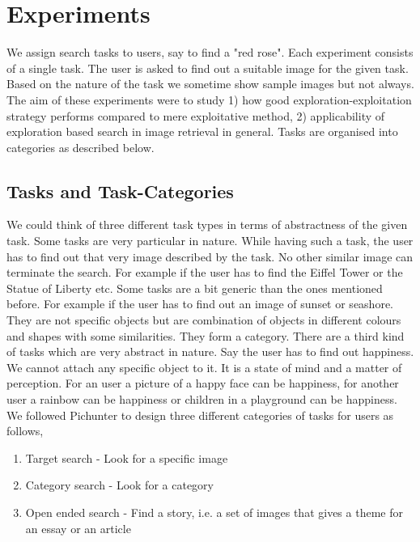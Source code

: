 \documentclass[english]{tktltiki}
\begin{document}
\section{Experiments}

We assign search tasks to users, say to find a "red rose". Each experiment consists of a single task. The user is asked to find out a suitable image for the given task. Based on the nature of the task we sometime show sample images but not always. The aim of these experiments were to study 1) how good exploration-exploitation strategy performs compared to mere exploitative method, 2) applicability of exploration based search in image retrieval in general. Tasks are organised into categories as described below.

\subsection{Tasks and Task-Categories}

 We could think of three different task types in terms of abstractness of the given task. Some tasks are very particular in nature. While having such a task, the user has to find out that very image described by the task. No other similar image can terminate the search. For example if the user has to find the Eiffel Tower or the Statue of Liberty etc. Some tasks are a bit generic than the ones mentioned before. For example if the user has to find out an image of sunset or seashore. They are not specific objects but are combination of objects in different colours and shapes with some similarities. They form a category. There are a third kind of tasks which are very abstract in nature. Say the user has to find out happiness. We cannot attach any specific object to it. It is a state of mind and a matter of perception. For an user a picture of a happy face can be happiness, for another user a rainbow can be happiness or children in a playground can be happiness. We followed Pichunter \cite{pichunter} to design three different categories of tasks for users as follows,

\begin{enumerate}
  \item Target search - Look for a specific image
  \item Category search - Look for a category
  \item Open ended search - Find a story, i.e. a set of images that gives a theme for an essay or an article
\end{enumerate}
\end{document}
